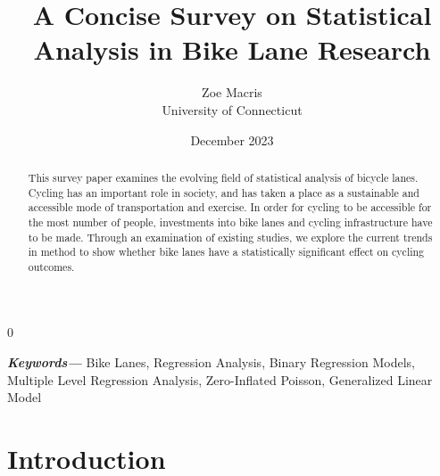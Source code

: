\documentclass[12pt, letterpaper]{article}
\newcommand{\blind}{0}
\providecommand{\keywords}[1]
{
  \small	
  \textbf{\textit{Keywords---}} #1
}
\begin{document}

\blind
{
  \title{\bf A Concise Survey on Statistical Analysis in Bike Lane Research}
  \author{Zoe Macris\\
  University of Connecticut}
\date{December 2023}
  \maketitle} 


\begin{abstract}
This survey paper examines the evolving field of statistical analysis of bicycle lanes. Cycling has an important role in society, and has taken a place as a sustainable and accessible mode of transportation and exercise. In order for cycling to be accessible for the most number of people, investments into bike lanes and cycling infrastructure have to be made. Through an examination of existing studies, we explore the current trends in method to show whether bike lanes have a statistically significant effect on cycling outcomes. 
\end{abstract}
\label{sec:abstract}

\keywords{Bike Lanes, Regression Analysis, Binary Regression Models, Multiple Level Regression Analysis, Zero-Inflated Poisson, Generalized Linear Model}


\section{Introduction}
\label{sec:intro}
\end{document}
